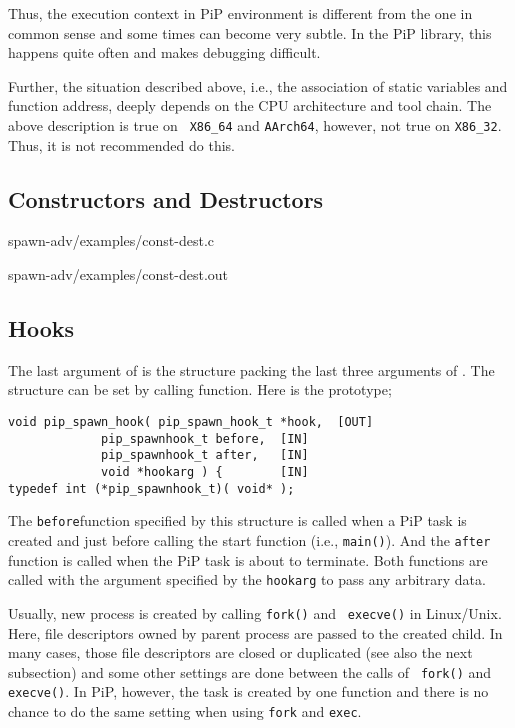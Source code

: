 Thus, the execution context in PiP environment is different from the
one in common sense and some times can become very subtle. In the PiP
library, this happens quite often and makes debugging difficult.

Further, the situation described above, i.e., the association of
static variables and function address, deeply depends on the CPU
architecture and tool chain. The above description is true on  {\tt
  X86_64} and {\tt AArch64}, however, not true on {\tt X86_32}. Thus,
it is not recommended do this.

\subsection{Constructors and Destructors}

 {spawn-adv/examples/const-dest.c}


                {spawn-adv/examples/const-dest.out}


\subsection{Hooks}

The last argument of  is the structure
packing the last three arguments of . The
 structure can be set by calling
 function. Here is the prototype;

\begin{lstlisting}[frame=tb]
void pip_spawn_hook( pip_spawn_hook_t *hook,  [OUT]
		     pip_spawnhook_t before,  [IN]
		     pip_spawnhook_t after,   [IN]
		     void *hookarg ) {        [IN]
typedef int (*pip_spawnhook_t)( void* );
\end{lstlisting}

The {\tt before}function specified by this structure is called when a
PiP task is created and just before calling the start function (i.e.,
{\tt main()}). And the {\tt after} function is called when the PiP
task is about to terminate. Both functions are called with the argument
specified by the {\tt hookarg} to pass any arbitrary data. 

Usually, new process is created by calling {\tt fork()} and {\tt
execve()} in Linux/Unix. Here, file descriptors owned by
parent process are passed to the created child. In many cases, those
file descriptors are closed or duplicated (see also the next
subsection) and some other settings are done between the calls of {\tt
  fork()} and {\tt execve()}. In PiP, however, the task is created
by one function and there is no chance to do the same setting when
using {\tt fork} and {\tt exec}. 

